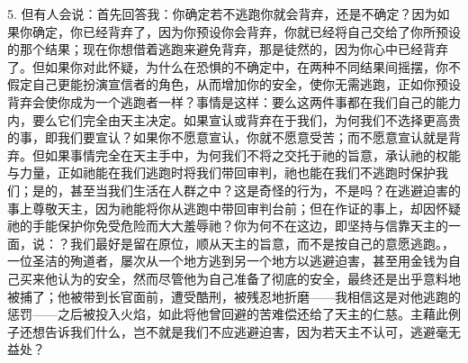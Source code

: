 5. 但有人会说：首先回答我：你确定若不逃跑你就会背弃，还是不确定？因为如果你确定，你已经背弃了，因为你预设你会背弃，你就已经将自己交给了你所预设的那个结果；现在你想借着逃跑来避免背弃，那是徒然的，因为你心中已经背弃了。但如果你对此怀疑，为什么在恐惧的不确定中，在两种不同结果间摇摆，你不假定自己更能扮演宣信者的角色，从而增加你的安全，使你无需逃跑，正如你预设背弃会使你成为一个逃跑者一样？事情是这样：要么这两件事都在我们自己的能力内，要么它们完全由天主决定。如果宣认或背弃在于我们，为何我们不选择更高贵的事，即我们要宣认？如果你不愿意宣认，你就不愿意受苦；而不愿意宣认就是背弃。但如果事情完全在天主手中，为何我们不将之交托于祂的旨意，承认祂的权能与力量，正如祂能在我们逃跑时将我们带回审判，祂也能在我们不逃跑时保护我们；是的，甚至当我们生活在人群之中？这是奇怪的行为，不是吗？在逃避迫害的事上尊敬天主，因为祂能将你从逃跑中带回审判台前；但在作证的事上，却因怀疑祂的手能保护你免受危险而大大羞辱祂？你为何不在这边，即坚持与信靠天主的一面，说：？我们最好是留在原位，顺从天主的旨意，而不是按自己的意愿逃跑。，一位圣洁的殉道者，屡次从一个地方逃到另一个地方以逃避迫害，甚至用金钱为自己买来他认为的安全，然而尽管他为自己准备了彻底的安全，最终还是出乎意料地被捕了；他被带到长官面前，遭受酷刑，被残忍地折磨——我相信这是对他逃跑的惩罚——之后被投入火焰，如此将他曾回避的苦难偿还给了天主的仁慈。主藉此例子还想告诉我们什么，岂不就是我们不应逃避迫害，因为若天主不认可，逃避毫无益处？\par

